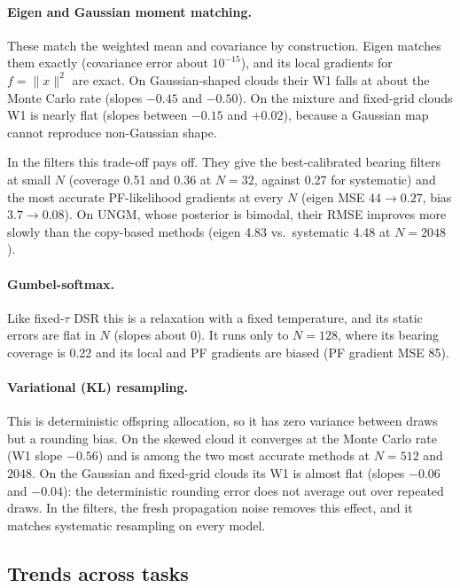 \paragraph{Eigen and Gaussian moment matching.}
These match the weighted mean and covariance by construction. Eigen matches them exactly (covariance error about $10^{-15}$), and its local gradients for $f=\|x\|^2$ are exact. On Gaussian-shaped clouds their W1 falls at about the Monte Carlo rate (slopes $-0.45$ and $-0.50$). On the mixture and fixed-grid clouds W1 is nearly flat (slopes between $-0.15$ and $+0.02$), because a Gaussian map cannot reproduce non-Gaussian shape.

In the filters this trade-off pays off. They give the best-calibrated bearing filters at small $N$ (coverage 0.51 and 0.36 at $N{=}32$, against 0.27 for systematic) and the most accurate PF-likelihood gradients at every $N$ (eigen MSE $44\to0.27$, bias $3.7\to0.08$). On UNGM, whose posterior is bimodal, their RMSE improves more slowly than the copy-based methods (eigen 4.83 vs.\ systematic 4.48 at $N{=}2048$).

\paragraph{Gumbel-softmax.}
Like fixed-$\tau$ DSR this is a relaxation with a fixed temperature, and its static errors are flat in $N$ (slopes about $0$). It runs only to $N{=}128$, where its bearing coverage is 0.22 and its local and PF gradients are biased (PF gradient MSE 85).

\paragraph{Variational (KL) resampling.}
This is deterministic offspring allocation, so it has zero variance between draws but a rounding bias. On the skewed cloud it converges at the Monte Carlo rate (W1 slope $-0.56$) and is among the two most accurate methods at $N{=}512$ and $2048$. On the Gaussian and fixed-grid clouds its W1 is almost flat (slopes $-0.06$ and $-0.04$): the deterministic rounding error does not average out over repeated draws. In the filters, the fresh propagation noise removes this effect, and it matches systematic resampling on every model.

\subsection*{Trends across tasks}

